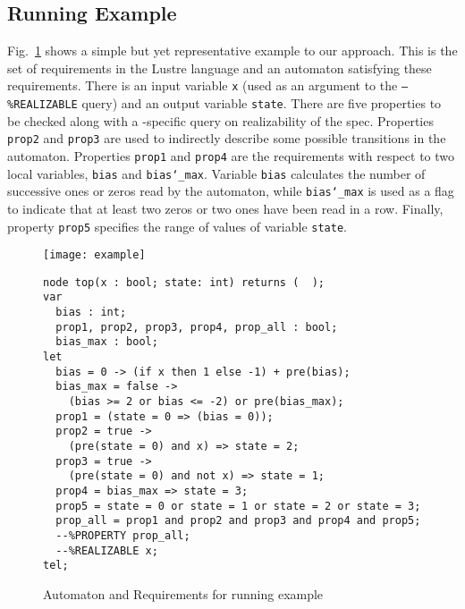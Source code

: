 
 \subsection{Running Example}
 
 
 Fig.~\ref{fg:example} shows a
 simple but yet representative example to our approach.
 This is the set of requirements  in the Lustre language and an automaton satisfying these requirements.
 There is an input variable \texttt{x} (used as an argument to the \texttt{--\%REALIZABLE} query) and an output variable \texttt{state}.
 There are five properties to be checked along with a
 \jkind-specific query on realizability of the spec. Properties
 \texttt{prop2} and \texttt{prop3} are used to indirectly describe some
 possible transitions in the automaton. Properties \texttt{prop1} and
 \texttt{prop4} are the requirements with respect to two local variables, \texttt{bias}
 and \texttt{bias\char`_max}. Variable \texttt{bias} calculates the number of successive
 ones or zeros read by the automaton, while \texttt{bias\char`_max} is used as a flag
 to indicate that at least two zeros or two ones have been read in a row.
 Finally, property \texttt{prop5} specifies the range of values of variable \texttt{state}.
 
\begin{figure}[tb]
\begin{minipage}[c]{0.35\textwidth}
\centering
\texttt{[image: example]}
\end{minipage}
\begin{minipage}[c]{0.7\textwidth}
 \begin{Verbatim}[fontsize=\scriptsize]
node top(x : bool; state: int) returns (  );
var
  bias : int;
  prop1, prop2, prop3, prop4, prop_all : bool;
  bias_max : bool;
let
  bias = 0 -> (if x then 1 else -1) + pre(bias);
  bias_max = false ->
	(bias >= 2 or bias <= -2) or pre(bias_max);
  prop1 = (state = 0 => (bias = 0));
  prop2 = true ->
  	(pre(state = 0) and x) => state = 2;
  prop3 = true ->
  	(pre(state = 0) and not x) => state = 1;
  prop4 = bias_max => state = 3;
  prop5 = state = 0 or state = 1 or state = 2 or state = 3;
  prop_all = prop1 and prop2 and prop3 and prop4 and prop5;
  --%PROPERTY prop_all;
  --%REALIZABLE x;
tel;
 \end{Verbatim}
\end{minipage}
\caption{Automaton and Requirements for running example}
\label{fg:example}
\end{figure}

